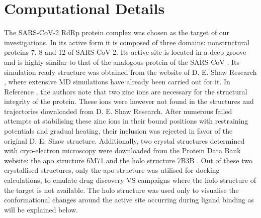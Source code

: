 \section{Computational Details}

The SARS-CoV-2 RdRp protein complex was chosen as the target of our investigations. In its active form it is composed of three domains: nonstructural proteins 7, 8 and 12 of SARS-CoV-2. Its active site is located in a deep groove and is highly similar to that of the analogous protein of the SARS-CoV \cite{covid_proteins}. Its simulation ready structure was obtained from the website of D. E. Shaw Research \cite{deshaw}, where extensive MD simulations have already been carried out for it. In Reference , the authors note that two zinc ions are necessary for the structural integrity of the protein. These ions were however not found in the structures and trajectories downloaded from D. E. Shaw Research.
After numerous failed attempts at stabilising these zinc ions in their bound positions with restraining potentials and gradual heating, their inclusion was rejected in favor of the original D. E. Shaw structure. Additionally, two crystal structures determined with cryo-electron microscopy were downloaded from the Protein Data Bank website: the apo structure 6M71 \cite{6m71} and the holo structure 7B3B \cite{7b3b}. Out of these two crystallised structures, only the apo structure was utilised for docking calculations, to emulate drug discovery VS campaigns where the holo structure of the target is not available. The holo structure was used only to visualise the conformational changes around the active site occurring during ligand binding as will be explained below. 


